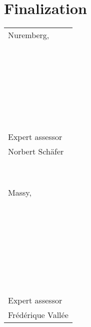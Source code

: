 \section{Finalization}



\begin{flushleft}
\tablefirsthead{}
\tablehead{}
\tabletail{}
\tablelasttail{}
\begin{supertabular}{| m{17cm}} 
\\
Nuremberg, \\
~

~

~
\\
~
\\
\\
Expert assessor\\

Norbert Sch\"afer\\
~
\\
\\
\\
\\
\\

Massy, \\
~

~

~
\\
~
\\
\\
\\
\\
Expert assessor\\

Fr\'ed\'erique Vall\'ee\\
\end{supertabular}
\end{flushleft}

\bigskip


\bigskip



\bigskip
